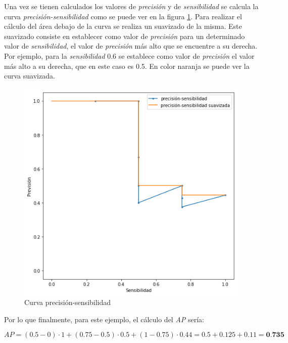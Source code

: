 Una vez se tienen calculados los valores de \textit{precisión} y de \textit{sensibilidad} se calcula la curva \textit{precisión-sensibilidad} como se puede ver en la figura \ref{fig:apprecisionrecallcurve}. Para realizar el cálculo del área debajo de la curva se realiza un suavizado de la misma. Este suavizado consiste en establecer como valor de \textit{precisión} para un determinado valor de \textit{sensibilidad}, el valor de \textit{precisión} más alto que se encuentre a su derecha. Por ejemplo, para la \textit{sensibilidad} 0.6 se establece como valor de \textit{precisión} el valor más alto a su derecha, que en este caso es 0.5. En color naranja se puede ver la curva suavizada.

\begin{figure}[H]
	\centering
	\includegraphics[width=0.7\linewidth]{images/ap_precision_recall_curve.png}
	\caption{Curva precisión-sensibilidad}
	\label{fig:apprecisionrecallcurve}
\end{figure}

Por lo que finalmente, para este ejemplo, el cálculo del \textit{AP} sería:

\begin{equation}
	AP = (0.5 - 0) \cdot 1 + (0.75 - 0.5) \cdot 0.5 + (1 - 0.75) \cdot 0.44 = 0.5 + 0.125 + 0.11 = \textbf{0.735}
	\nonumber
\end{equation}